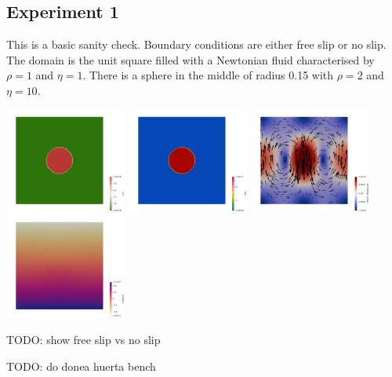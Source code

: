 \newpage
\subsection*{Experiment 1}

This is a basic sanity check. Boundary conditions are either free slip or no slip.
The domain is the unit square filled with a Newtonian fluid characterised by 
$\rho=1$ and $\eta=1$. There is a sphere in the middle of radius 0.15 with $\rho=2$
and $\eta=10$.

\begin{center}
\includegraphics[width=4cm]{python_codes/fieldstone_158/results/exp1/rho}
\includegraphics[width=4cm]{python_codes/fieldstone_158/results/exp1/eta}
\includegraphics[width=4cm]{python_codes/fieldstone_158/results/exp1/vel}
\includegraphics[width=4cm]{python_codes/fieldstone_158/results/exp1/press}
\end{center} 



TODO: show free slip vs no slip

TODO: do donea huerta bench




